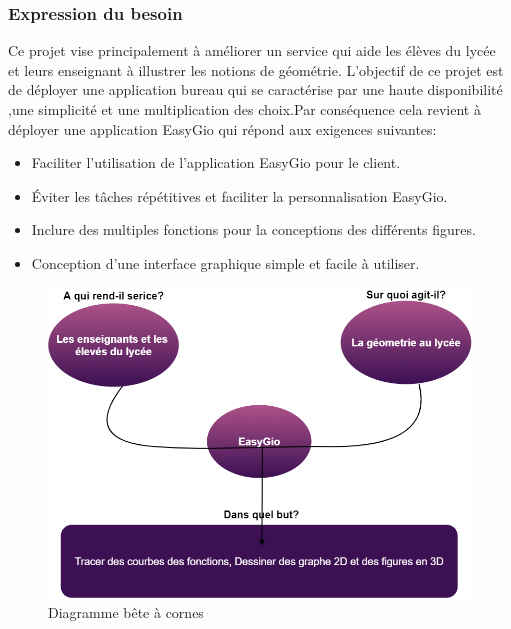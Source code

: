 \documentclass[a4paper]{report}
\begin{document}
\subsubsection{Expression du besoin}
Ce projet vise principalement à améliorer un service qui aide les élèves du lycée et leurs enseignant à illustrer les notions de géométrie. L’objectif de ce projet est de déployer une application bureau qui se caractérise par une haute disponibilité ,une simplicité et une multiplication des choix.Par conséquence cela revient à déployer une application EasyGio qui répond aux exigences suivantes:
\begin{itemize}
    \item Faciliter l'utilisation de l'application EasyGio pour le client.
    \item Éviter les tâches répétitives et faciliter la personnalisation EasyGio.
    \item Inclure des multiples fonctions pour la conceptions des différents figures.
    \item Conception d'une interface graphique simple et facile à utiliser.
\end{itemize}
\begin{figure}[!h]
    \centering
    \includegraphics[width=14cm]{images/Expression du besoin.png}
    \caption{Diagramme bête à cornes}
    \label{fig:Diagramme bête à cornes}
\end{figure}
\end{document}
